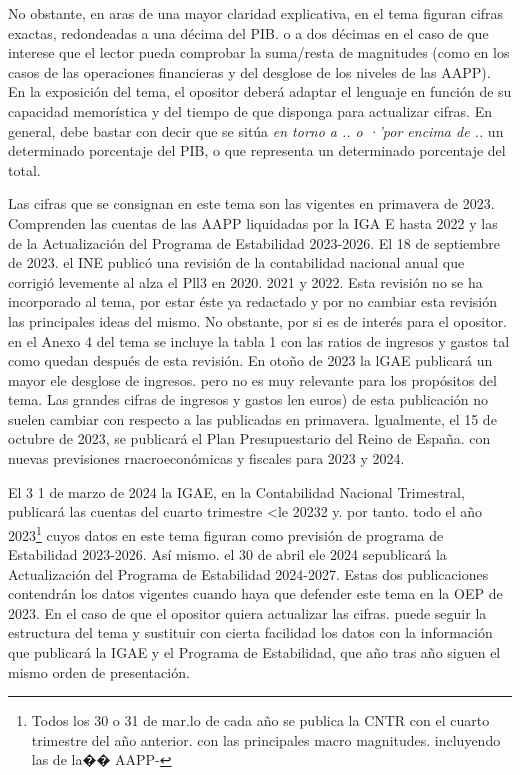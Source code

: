 \documentclass[10pt,a4paper]{article}
\begin{document}
No obstante, en aras de una mayor claridad explicativa, en el tema figuran cifras exactas, redondeadas a una décima del PIB. o a dos décimas en el caso de que interese que el lector pueda comprobar la suma/resta de magnitudes (como en los casos de las operaciones financieras y del desglose de los niveles de las AAPP). En la exposición del tema, el opositor deberá adaptar el lenguaje en función de su capacidad memorística y del tiempo de que disponga para actualizar cifras. En general, debe bastar con decir que se sitúa \textit{en torno a .. o ·'por encima de .. } un determinado porcentaje del PIB, o que representa un determinado porcentaje del total.

Las cifras que se consignan en este tema son las vigentes en primavera de 2023. Comprenden las cuentas de las AAPP liquidadas por la IGA E hasta 2022 y las de la Actualización del Programa de Estabilidad 2023-2026. El 18 de septiembre de 2023. el INE publicó una revisión de la contabilidad nacional anual que corrigió levemente al alza el Pll3 en 2020. 2021 y 2022. Esta revisión no se ha incorporado al tema, por estar éste ya redactado y por no cambiar esta revisión las principales ideas del mismo. No obstante, por si es de interés para el opositor. en el Anexo 4 del tema se incluye la tabla 1 con las ratios de ingresos y gastos tal como quedan después de esta revisión. En otoño de 2023 la lGAE publicará un mayor ele desglose de ingresos. pero no es muy relevante para los propósitos del tema. Las grandes cifras de ingresos y gastos len euros) de esta publicación no suelen cambiar con respecto a las publicadas en primavera. lgualmente, el 15 de octubre de 2023, se publicará el Plan Presupuestario del Reino de España. con nuevas previsiones rnacroeconómicas y fiscales para 2023 y 2024.

El 3 1 de marzo de 2024 la IGAE, en la Contabilidad Nacional Trimestral, publicará las cuentas del cuarto trimestre <le 20232 y. por tanto. todo el año 2023\footnote{%
    Todos los 30 o 31 de mar.lo de cada año se publica la CNTR con el cuarto trimestre del año anterior. con las principales macro magnitudes. incluyendo las de la�� AAPP-
} cuyos datos en este tema figuran como previsión de programa de Estabilidad 2023-2026. Así mismo. el 30 de abril ele 2024 sepublicará la Actualización del Programa de Estabilidad 2024-2027. Estas dos publicaciones contendrán los datos vigentes cuando haya que defender este tema en la OEP de 2023. En el caso de que el opositor quiera actualizar las cifras. puede seguir la estructura del tema y sustituir con cierta facilidad los datos con la información que publicará la IGAE y el Programa de Estabilidad, que año tras año siguen el mismo orden de presentación. 
\end{document}
